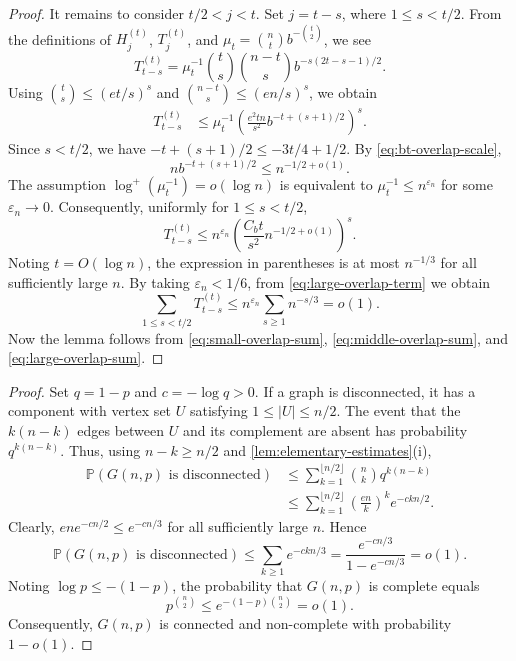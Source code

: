 \documentclass[11pt,reqno]{amsart}
\newtheorem{lemma}[theorem]{Lemma}
\theoremstyle{definition}
\theoremstyle{remark}
\newcommand{\PP}{\mathbb P}
\begin{document}
\begin{proof}
It remains to consider $t/2<j<t$.  Set $j=t-s$, where
$1\le s<t/2$.  From the definitions of $H_j^{(t)}$, $T_j^{(t)}$, and
$\mu_t=\binom ntb^{-\binom t2}$, we see
\[
 T_{t-s}^{(t)}
 =\mu_t^{-1}\binom ts\binom{n-t}s
 b^{-s(2t-s-1)/2}
 .
\]
Using $\binom ts\le(et/s)^s$ and
$\binom{n-t}s\le(en/s)^s$, we obtain
\begin{align*}
 T_{t-s}^{(t)}
 &\le \mu_t^{-1}
 \left(\frac{e^2tn}{s^2}
 b^{-t+(s+1)/2}\right)^s.
\end{align*}
Since $s<t/2$, we have
$-t+(s+1)/2\le-3t/4+1/2$.  By
\eqref{eq:bt-overlap-scale},
\[
 n b^{-t+(s+1)/2}
 \le n^{-1/2+o(1)}.
\]
The assumption $\log^+(\mu_t^{-1})=o(\log n)$ is equivalent to
$\mu_t^{-1}\le n^{\varepsilon_n}$ for some 
$\varepsilon_n\to0$.  Consequently, uniformly for $1\le s<t/2$,
\begin{equation}\label{eq:large-overlap-term}
 T_{t-s}^{(t)}
 \le n^{\varepsilon_n}
 \left(\frac{C_bt}{s^2}n^{-1/2+o(1)}\right)^s.
\end{equation}
Noting $t=O(\log n)$, the expression in parentheses is at most
$n^{-1/3}$ for all sufficiently large $n$.
By taking $\varepsilon_n<1/6$, from
\eqref{eq:large-overlap-term} we obtain
\begin{equation}\label{eq:large-overlap-sum}
 \sum_{1\le s<t/2}T_{t-s}^{(t)}
 \le n^{\varepsilon_n}\sum_{s\ge1}n^{-s/3}
 =o(1).
\end{equation}
Now the lemma follows from \eqref{eq:small-overlap-sum},
\eqref{eq:middle-overlap-sum}, and \eqref{eq:large-overlap-sum}.
\end{proof}


\begin{proof}
Set $q=1-p$ and $c=-\log q>0$.  If a graph is disconnected, it has a
 component with vertex set $U$ satisfying
$1\le|U|\le n/2$.  The event that 
the $k(n-k)$ edges between $U$ and its complement are absent  has probability
$q^{k(n-k)}$.  Thus, using $n-k\ge n/2$ and
\cref{lem:elementary-estimates}(i),
\begin{align*}
 \PP(G(n,p)\text{ is disconnected})
 &\le\sum_{k=1}^{\lfloor n/2\rfloor}
   \binom nkq^{k(n-k)}\\
 &\le\sum_{k=1}^{\lfloor n/2\rfloor}
   \left(\frac{en}{k}\right)^k e^{-ckn/2}.
\end{align*}
Clearly,
$en e^{-cn/2}\le e^{-cn/3}$ for all sufficiently large $n$.  Hence
\[
 \PP(G(n,p)\text{ is disconnected})
 \le\sum_{k\ge1}e^{-ckn/3}
 =\frac{e^{-cn/3}}{1-e^{-cn/3}}=o(1).
\]
Noting $\log p\le-(1-p)$, the probability that $G(n,p)$ is complete equals
\[
 p^{\binom n2}\le e^{-(1-p)\binom n2}=o(1).
\]
Consequently, $G(n,p)$ is connected and non-complete with probability
$1-o(1)$.
\end{proof}
\end{document}
